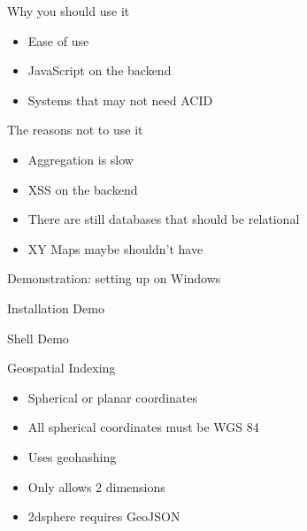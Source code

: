 \documentclass{beamer}
\begin{document}
\begin{frame}{Why you should use it}

\begin{itemize}
\item Ease of use
\item JavaScript on the backend
\item Systems that may not need ACID
\end{itemize}

\end{frame}


\begin{frame}{The reasons not to use it}

\begin{itemize}
\item Aggregation is slow
\item XSS on the backend
\item There are still databases that should be relational
\item XY Maps maybe shouldn't have
\end{itemize}

\end{frame}


\begin{frame}{Demonstration: setting up on Windows} %

\begin{center}
   Installation Demo
\end{center}

\end{frame}


\begin{frame}%

\begin{center}
   Shell Demo
\end{center}

\end{frame}


\begin{frame}{Geospatial Indexing}

\begin{itemize}
\item Spherical or planar coordinates
\item All spherical coordinates must be WGS 84
\item Uses geohashing
\item Only allows 2 dimensions
\item 2dsphere requires GeoJSON
\end{itemize}

\end{frame}
\end{document}

